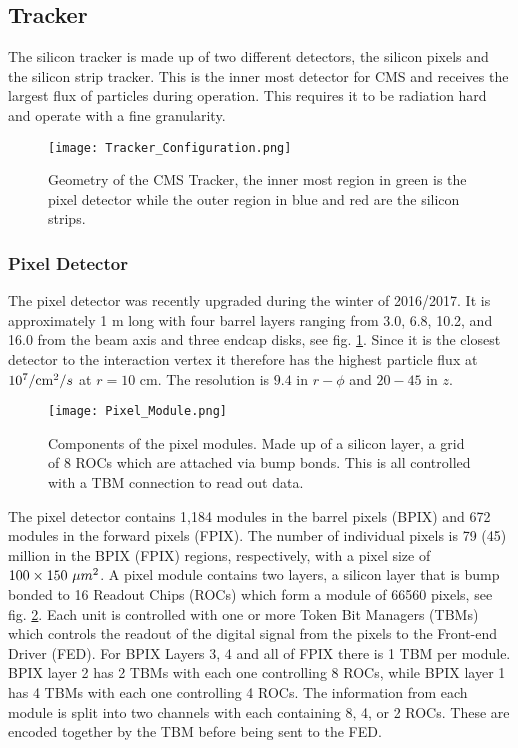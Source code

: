 \subsection{Tracker}
\label{sec:Tracker}

The silicon tracker is made up of two different detectors, the silicon pixels and the silicon strip tracker. This is the inner most detector for CMS and receives the largest flux of particles during operation. This requires it to be radiation hard and operate with a fine granularity. 

\begin{figure}
 	\centering
	\texttt{[image: Tracker\_Configuration.png]}
 	\caption[CMS Tracker Geometry]{Geometry of the CMS Tracker, the inner most region in green is the pixel detector while the outer region in blue and red are the silicon strips.}
 	\label{CMSTracker} 
\end{figure}

\subsubsection{Pixel Detector}
\label{subsec:Pixel}

The pixel detector was recently upgraded during the winter of 2016/2017. It is approximately 1 m long with four barrel layers ranging from 3.0, 6.8, 10.2, and 16.0 \cm{} from the beam axis and three endcap disks, see fig. \ref{CMSTracker}. Since it is the closest detector to the interaction vertex it therefore has the highest particle flux at $10^7/\text{cm}^2/s$ at $r=10$ cm. The resolution is $9.4$ \mum{} in $r-\phi$ and $20-45$ \mum{} in $z$.

\begin{figure}
 	\centering
	\texttt{[image: Pixel\_Module.png]}
 	\caption[Pixel Modules]{Components of the pixel modules. Made up of a silicon layer, a grid of 8 ROCs which are attached via bump bonds. This is all controlled with a TBM connection to read out data.}
 	\label{PixelModule} 
\end{figure}

The pixel detector contains 1,184 modules in the barrel pixels (BPIX) and 672 modules in the forward pixels (FPIX). The number of individual pixels is 79 (45) million in the BPIX (FPIX) regions, respectively, with a pixel size of $100\times150 \text{ }\text{}\mu m^2$. A pixel module contains two layers, a silicon layer that is bump bonded to 16 Readout Chips (ROCs) which form a module of 66560 pixels, see fig. \ref{PixelModule}. Each unit is controlled with one or more Token Bit Managers (TBMs) which controls the readout of the digital signal from the pixels to the Front-end Driver (FED). For BPIX Layers 3, 4 and all of FPIX there is 1 TBM per module. BPIX layer 2 has 2 TBMs with each one controlling 8 ROCs, while BPIX layer 1 has 4 TBMs with each one controlling 4 ROCs. The information from each module is split into two channels with each containing 8, 4, or 2 ROCs. These are encoded together by the TBM before being sent to the FED.


